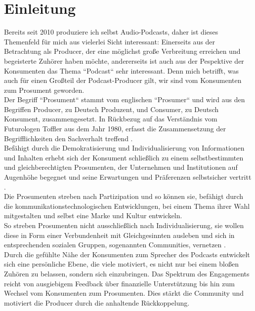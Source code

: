 \documentclass[11pt,a4paper]{scrreprt}
\begin{document}
\chapter{Einleitung}
\thispagestyle{fancy}
\setcounter{page}{1} 
Bereits seit 2010 produziere ich selbst Audio-Podcasts, daher ist dieses Themenfeld für mich aus vielerlei Sicht interessant: Einerseits aus der Betrachtung als Producer, der eine möglichst große Verbreitung erreichen und begeisterte Zuhörer haben möchte, andererseits ist auch aus der Pespektive der Konsumenten das Thema ``Podcast`` sehr interessant. Denn mich betrifft, was auch für einen Großteil der Podcast-Producer gilt, wir sind vom Konsumenten zum Prosument geworden. \\ Der Begriff ``Prosument`` stammt vom englischen ``Prosumer`` und wird aus den Begriffen Producer, zu Deutsch Produzent, und Consumer, zu Deutsch Konsument, zusammengesetzt. In Rückbezug auf das Verständnis vom Futurologen Toffler aus dem Jahr 1980, erfasst die Zusammensetzung der Begrifflichkeiten den Sachverhalt treffend \cite{SusannaRasch2016}.\\ 
Befähigt durch die Demokratisierung und Individualisierung von Informationen und Inhalten erhebt sich der Konsument schließlich zu einem selbstbestimmten und gleichberechtigten Prosumenten, der Unternehmen und Institutionen auf Augenhöhe begegnet und seine Erwartungen und Präferenzen selbstsicher vertritt \cite[S. 1]{Michelis2014}. \\
Die Prosumenten streben nach Partizipation und so können sie, befähigt durch die kommunikationstechnologischen Entwicklungen, bei einem Thema ihrer Wahl mitgestalten und selbst eine Marke und Kultur entwickeln.\\ So streben Prosumenten nicht ausschließlich nach Individualisierung, sie wollen diese in Form einer Verbundenheit mit Gleichgesinnten ausleben und sich in entsprechenden sozialen Gruppen, sogenannten Communities, vernetzen \cite[S. 308] {Baumann2014}. \\
Durch die gefühlte Nähe der Konsumenten zum Sprecher des Podcasts entwickelt sich eine persönliche Ebene, die viele motiviert, es nicht nur bei einem bloßen Zuhören zu belassen, sondern sich einzubringen. Das Spektrum des Engagements reicht von ausgiebigem Feedback über finanzielle Unterstützung bis hin zum Wechsel vom Konsumenten zum Prosumenten. Dies stärkt die Community und motiviert die Producer durch die anhaltende Rückkoppelung. 
\end{document}
